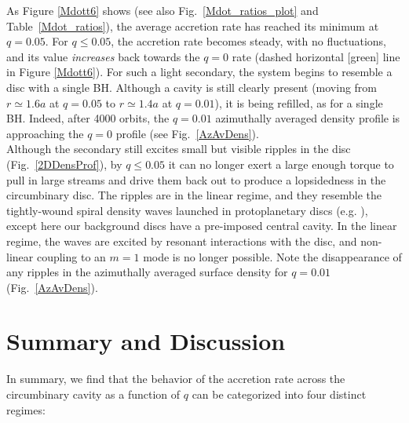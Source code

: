 As Figure \ref{Mdott6} shows (see also Fig.~\ref{Mdot_ratios_plot} and
Table~\ref{Mdot_ratios}), the average accretion rate has reached its
minimum at $q=0.05$. For $q \leq 0.05$, the accretion rate
becomes steady, with no fluctuations, and its value {\em increases}
back towards the $q=0$ rate (dashed horizontal [green] line in Figure
\ref{Mdott6}).  For such a light secondary, the system
begins to resemble a disc with a single BH.  Although a cavity is
still clearly present (moving from $r\simeq1.6a$ at $q=0.05$ to
$r\simeq1.4a$ at $q=0.01$), it is being refilled, as for a single
BH. Indeed, after 4000 orbits, the $q=0.01$ azimuthally averaged density
profile is approaching the $q=0$ profile (see
Fig.~\ref{AzAvDens}). \\


Although the secondary still excites small but visible ripples in the
disc (Fig.~\ref{2DDensProf}), by $q\leq0.05$ it can no longer exert a
large enough torque to pull in large streams and drive them back out
to produce a lopsidedness in the circumbinary disc.  The ripples are 
in the linear regime, and they resemble the tightly-wound
spiral density waves launched in protoplanetary discs
(e.g. \citealt{GT80,DongRafI:2011,DM2012:gaps}), except here our
background discs have a pre-imposed central cavity.  In the 
linear regime, the waves are excited by resonant interactions with the
disc, and non-linear coupling to an $m=1$ mode is no longer
possible. Note the disappearance of any ripples in the azimuthally
averaged surface density for $q = 0.01$ (Fig.~\ref{AzAvDens}).



\section{Summary and Discussion}
\label{Summary and Discussion}
In summary, we find that the behavior of the accretion rate across the
circumbinary cavity as a function of $q$ can be categorized into four
distinct regimes:

